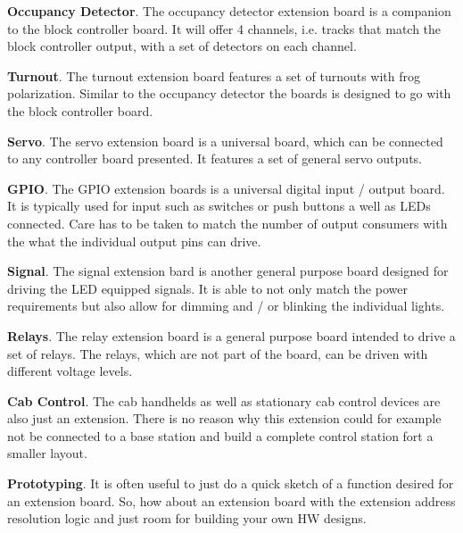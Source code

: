 
\begin{smallGapItemize}
\item \textbf{Occupancy Detector}. The occupancy detector extension board is a companion to the block controller board. It will offer 4 channels, i.e. tracks that match the block controller output, with a set of detectors on each channel.
\item \textbf{Turnout}. The turnout extension board features a set of turnouts with frog polarization. Similar to the occupancy detector the boards is designed to go with the block controller board.
\item \textbf{Servo}. The servo extension board is a universal board, which can be connected to any controller board presented. It features a set of general servo outputs.
\item \textbf{GPIO}. The GPIO extension boards is a universal digital input / output board. It is typically used for input such as switches or push buttons a well as LEDs connected. Care has to be taken to match the number of output consumers with the what the individual output pins can drive.
\item \textbf{Signal}. The signal extension bard is another general purpose board designed for driving the LED equipped signals. It is able to not only match the power requirements but also allow for dimming and / or blinking the individual lights.
\item \textbf{Relays}. The relay extension board is a general purpose board intended to drive a set of relays. The relays, which are not part of the board, can be driven with different voltage levels.
\item \textbf{Cab Control}. The cab handhelds as well as stationary cab control devices are also just an extension. There is no reason why this extension could for example not be connected to a base station and build a complete control station fort a smaller layout.
\item \textbf{Prototyping}. It is often useful to just do a quick sketch of a function desired for an extension board. So, how about an extension board with the extension address resolution logic and just room for building your own HW designs.
\end{smallGapItemize}











